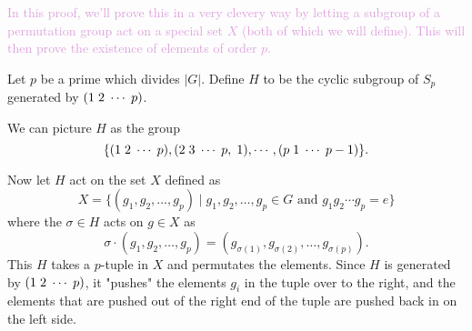    \begin{prf}
        \textcolor{Plum}{In this proof, we'll prove this in a very
        clevery way by letting a subgroup of a permutation group act
        on a special set $X$ (both of which we will define). This will then prove the existence of
        elements of order $p$.}

        Let $p$ be a prime which divides $|G|$. 
        Define $H$ to be the cyclic subgroup of $S_p$ generated by
        $(1\hspace{.1cm}2\hspace{.1cm}\cdots\hspace{.1cm}p)$. 

        We can picture $H$ as the group 
        \[
            \{(1\hspace{.1cm}2\hspace{.1cm}\cdots\hspace{.1cm}p), (2\hspace{.1cm}3\hspace{.1cm}\cdots\hspace{.1cm}p, \hspace{.1cm}1), \cdots, (p\hspace{.1cm}1\hspace{.1cm}\cdots\hspace{.1cm}p-1)\}.
        \]

        Now let $H$ act on the set $X$ defined as 
        \[
            X = \{ (g_1, g_2, \dots, g_p) \mid g_1, g_2, \dots, g_p \in G \text{ and } g_1g_2\cdots g_p = e \}
        \]
        where the $\sigma \in H$ acts on $g \in X$ as 
        \[
            \sigma \cdot (g_1, g_2, \dots, g_p) = (g_{\sigma(1)}, g_{\sigma(2)}, \dots, g_{\sigma(p)}).
        \]
        This $H$ takes a $p$-tuple in $X$ and permutates the elements.
        Since $H$ is generated by
        $(1\hspace{.1cm}2\hspace{.1cm}\cdots\hspace{.1cm}p)$, it
        "pushes" the elements $g_i$ in the tuple over to the right, and the elements
        that are pushed out of the right end of the tuple are pushed back in on
        the left side.


\end{prf}
